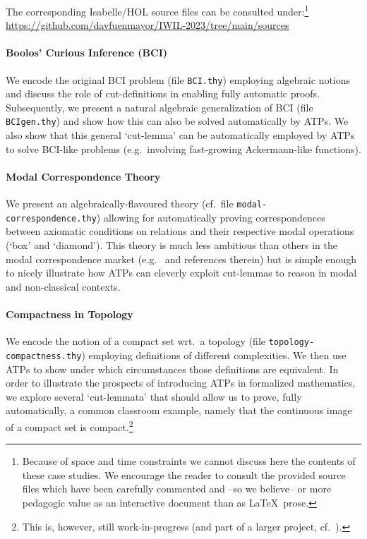 \documentclass{article}
\begin{document}
The corresponding Isabelle/HOL source files can be consulted under:\footnote{Because of space and time constraints we cannot discuss here the contents of these case studies. We encourage the reader to consult the provided source files which have been carefully commented and --so we believe-- or more pedagogic value as an interactive document than as \LaTeX\ prose.} \\ \url{https://github.com/davfuenmayor/IWIL-2023/tree/main/sources}

\paragraph*{Boolos' Curious Inference (BCI)}
We encode the original BCI problem (file \texttt{BCI.thy}) employing algebraic notions and discuss the role of cut-definitions in enabling fully automatic proofs. Subsequently, we present a natural algebraic generalization of BCI (file \texttt{BCIgen.thy}) and show how this can also be solved automatically by ATPs. We also show that this general `cut-lemma' can be automatically employed by ATPs to solve BCI-like problems (e.g.~involving fast-growing Ackermann-like functions).

\paragraph*{Modal Correspondence Theory}
We present an algebraically-flavoured theory (cf.~file \texttt{modal-correspondence.thy}) allowing for automatically proving correspondences between axiomatic conditions on relations and their respective modal operations (`box' and `diamond'). This theory is much less ambitious than others in the modal correspondence market (e.g.~\cite{Conradie2012} and references therein) but is simple enough to nicely illustrate how ATPs can cleverly exploit cut-lemmas to reason in modal and non-classical contexts.

\paragraph*{Compactness in Topology}
We encode the notion of a compact set wrt.~a topology (file \texttt{topology-compactness.thy}) employing definitions of different complexities. We then use ATPs to show under which circumstances those definitions are equivalent. In order to illustrate the prospects of introducing ATPs in formalized mathematics, we explore several `cut-lemmata' that should allow us to prove, fully automatically, a common classroom example, namely that the continuous image of a compact set is compact.\footnote{This is, however, still work-in-progress (and part of a larger project, cf.~\cite{CICM22}).}
\\ 










 

\end{document}
